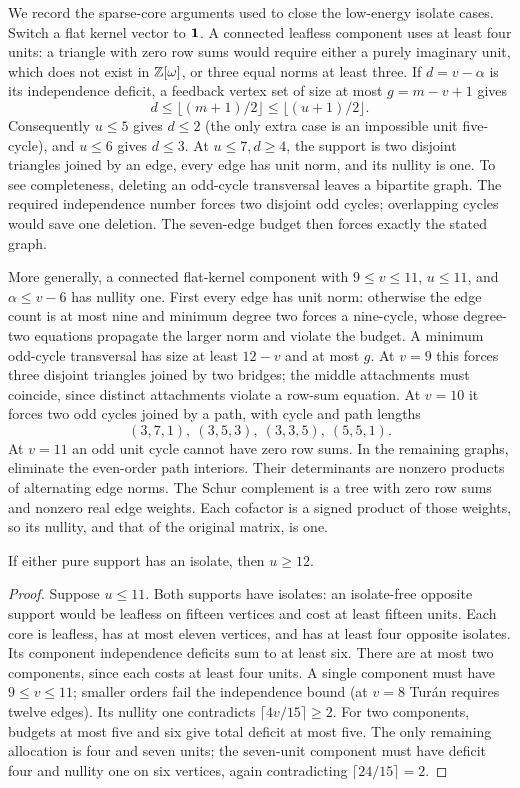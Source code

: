 We record the sparse-core arguments used to close the low-energy isolate cases. Switch a flat kernel vector to $\mathbf1$. A connected leafless component uses at least four units: a triangle with zero row sums would require either a purely imaginary unit, which does not exist in $\mathbb Z[\omega]$, or three equal norms at least three. If $d=v-\alpha$ is its independence deficit, a feedback vertex set of size at most $g=m-v+1$ gives
\[d\le\lfloor(m+1)/2\rfloor\le\lfloor(u+1)/2\rfloor.\]
Consequently $u\le5$ gives $d\le2$ (the only extra case is an impossible unit five-cycle), and $u\le6$ gives $d\le3$. At $u\le7,d\ge4$, the support is two disjoint triangles joined by an edge, every edge has unit norm, and its nullity is one. To see completeness, deleting an odd-cycle transversal leaves a bipartite graph. The required independence number forces two disjoint odd cycles; overlapping cycles would save one deletion. The seven-edge budget then forces exactly the stated graph.

More generally, a connected flat-kernel component with $9\le v\le11$, $u\le11$, and $\alpha\le v-6$ has nullity one. First every edge has unit norm: otherwise the edge count is at most nine and minimum degree two forces a nine-cycle, whose degree-two equations propagate the larger norm and violate the budget. A minimum odd-cycle transversal has size at least $12-v$ and at most $g$. At $v=9$ this forces three disjoint triangles joined by two bridges; the middle attachments must coincide, since distinct attachments violate a row-sum equation. At $v=10$ it forces two odd cycles joined by a path, with cycle and path lengths
\[(3,7,1),\ (3,5,3),\ (3,3,5),\ (5,5,1).\]
At $v=11$ an odd unit cycle cannot have zero row sums. In the remaining graphs, eliminate the even-order path interiors. Their determinants are nonzero products of alternating edge norms. The Schur complement is a tree with zero row sums and nonzero real edge weights. Each cofactor is a signed product of those weights, so its nullity, and that of the original matrix, is one.

\begin{lemma}\label{lem:pure-isolates-new}
If either pure support has an isolate, then $u\ge12$.
\end{lemma}
\begin{proof}
Suppose $u\le11$. Both supports have isolates: an isolate-free opposite support would be leafless on fifteen vertices and cost at least fifteen units. Each core is leafless, has at most eleven vertices, and has at least four opposite isolates. Its component independence deficits sum to at least six. There are at most two components, since each costs at least four units. A single component must have $9\le v\le11$; smaller orders fail the independence bound (at $v=8$ Tur\'an requires twelve edges). Its nullity one contradicts $\lceil4v/15\rceil\ge2$. For two components, budgets at most five and six give total deficit at most five. The only remaining allocation is four and seven units; the seven-unit component must have deficit four and nullity one on six vertices, again contradicting $\lceil24/15\rceil=2$.
\end{proof}

